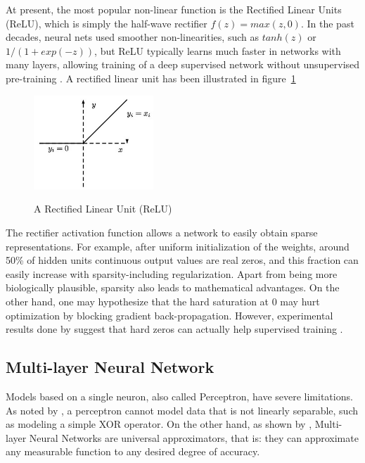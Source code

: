 \indent At present, the most popular non-linear function is the Rectified Linear Units (ReLU), which is simply the half-wave rectifier $f(z) = max(z, 0)$. In the past decades, neural nets used smoother non-linearities, such as $tanh(z)$ or $1/(1+ exp(-z))$, but ReLU typically learns much faster in networks with many layers, allowing training of a deep supervised network without unsupervised pre-training \cite{lecun2015deep}. A rectified linear unit has been illustrated in figure~\ref{fig:relu}

\begin{figure}[H]
	\centering
	{\includegraphics[width=0.4\textwidth]{images/relu}}
	\caption{A Rectified Linear Unit (ReLU)}
	\label{fig:relu}
\end{figure}

\indent The rectifier activation function allows a network to easily obtain sparse representations. For example, after uniform initialization of the weights, around 50\% of hidden units continuous output values are real zeros, and this fraction can easily increase with sparsity-including regularization. Apart from being more biologically plausible, sparsity also leads to mathematical advantages. On the other hand, one may hypothesize that the hard saturation at 0 may hurt optimization by blocking gradient back-propagation. However, experimental results done by \citeauthor{glorot2011deep} suggest that hard zeros can actually help supervised training \cite{glorot2011deep}.  


\subsection{Multi-layer Neural Network}

Models based on a single neuron, also called Perceptron, have severe limitations. As noted by \citealt*{preparata2012computational}, a perceptron cannot model data that is not linearly separable, such as modeling a simple XOR operator. On the other hand, as shown by \citealt{hornik1989multilayer}, Multi-layer Neural Networks are universal approximators, that is: they can approximate any measurable function to any desired degree of accuracy.


